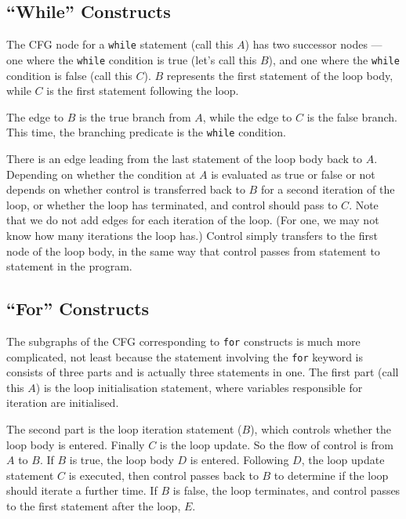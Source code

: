 
\subsection{``While'' Constructs}

The CFG node for a {\tt while} statement (call this $A$) has two successor nodes
--- one where the {\tt while} condition is true (let's call this $B$), and one
where the {\tt while} condition is false (call this $C$). $B$ represents the
first statement of the loop body, while $C$ is the first statement following the
loop. 

The edge to $B$ is the true branch from $A$, while the edge to $C$ is the false
branch. This time, the branching predicate is the {\tt while} condition.


There is an edge leading from the last statement of the loop body back to $A$.
Depending on whether the condition at $A$ is evaluated as true or false or not
depends on whether control is transferred back to $B$ for a second iteration of
the loop, or whether the loop has terminated, and control should pass to $C$.
Note that we do not add edges for each iteration of the loop. (For one, we may
not know how many iterations the loop has.) Control simply transfers to the
first node of the loop body, in the same way that control passes from statement
to statement in the program.


\subsection{``For'' Constructs}

The subgraphs of the CFG corresponding to {\tt for} constructs is much more
complicated, not least because the statement involving the {\tt for} keyword is
consists of three parts and is actually three statements in one. The first part
(call this $A$) is the loop initialisation statement, where variables
responsible for iteration are initialised. 


The second part is the loop iteration statement ($B$), which controls whether
the loop body is entered. Finally $C$ is the loop update. So the flow of control
is from $A$ to $B$. If $B$ is true, the loop body $D$ is entered. Following $D$,
the loop update statement $C$ is executed, then control passes back to $B$ to
determine if the loop should iterate a further time. If $B$ is false, the loop
terminates, and control passes to the first statement after the loop, $E$. 

